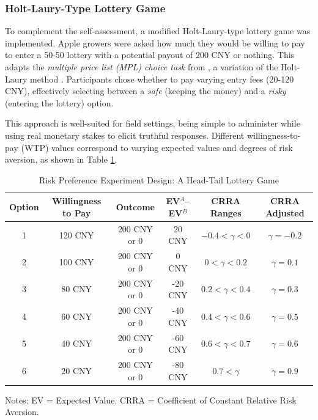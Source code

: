 \subsubsection{Holt-Laury-Type Lottery Game}  
\noindent To complement the self-assessment, a modified Holt-Laury-type lottery game was implemented. Apple growers were asked how much they would be willing to pay to enter a 50-50 lottery with a potential payout of 200 CNY or nothing. This adapts the \textit{multiple price list (MPL) choice task} from \cite{brick2012risk}, a variation of the Holt-Laury method \citep{holt2002risk}. Participants chose whether to pay varying entry fees (20-120 CNY), effectively selecting between a \textit{safe} (keeping the money) and a \textit{risky} (entering the lottery) option.  

This approach is well-suited for field settings, being simple to administer while using real monetary stakes to elicit truthful responses. Different willingness-to-pay (WTP) values correspond to varying expected values and degrees of risk aversion, as shown in Table \ref{tab:experiment_design}.  


\begin{table}[H]
    \centering
    \footnotesize 
    \caption{Risk Preference Experiment Design: A Head-Tail Lottery Game}
    \renewcommand{\arraystretch}{1.2}
    \begin{tabular}{cccccc}
        \toprule
        \textbf{Option} & \textbf{Willingness to Pay} & \textbf{Outcome} & \textbf{EV$^{A}$--EV$^{B}$} & \textbf{CRRA Ranges} & \textbf{CRRA Adjusted}\\
        \midrule
        1 & 120 CNY & 200 CNY or 0 & 20 CNY & $-0.4 < \gamma < 0$  & $\gamma = -0.2$\\
        2 & 100 CNY & 200 CNY or 0 & 0 CNY & $0 < \gamma < 0.2$  & $\gamma= 0.1$ \\
        3 & 80 CNY & 200 CNY or 0 & -20 CNY & $0.2 < \gamma < 0.4$  & $\gamma= 0.3$ \\
        4 & 60 CNY & 200 CNY or 0 & -40 CNY & $0.4 < \gamma < 0.6$  & $\gamma= 0.5$ \\
        5 & 40 CNY & 200 CNY or 0 & -60 CNY & $0.6 < \gamma < 0.7$  & $\gamma=0.6$ \\
        6 & 20 CNY & 200 CNY or 0 & -80 CNY & $0.7 < \gamma$  & $\gamma= 0.9$ \\
        \bottomrule
    \end{tabular}
    \label{tab:experiment_design}
    \vspace{0.5em}
    \small Notes: EV = Expected Value. CRRA = Coefficient of Constant Relative Risk Aversion.
\end{table}

